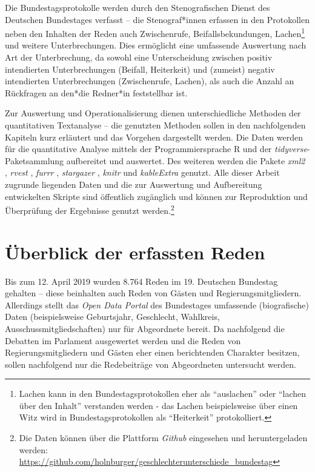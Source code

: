 \documentclass[12pt, 
    twoside=false, 
    bibliography=totoc, 
    numbers=endperiod, 
    headings=normal, 
    toc=chapterentrydotfill
    ]{scrbook}
\begin{document}
Die Bundestagsprotokolle werden durch den Stenografischen Dienst des Deutschen Bundestages verfasst -- die Stenograf*innen erfassen in den Protokollen neben den Inhalten der Reden auch Zwischenrufe, Beifallsbekundungen, Lachen\footnote{Lachen kann in den Bundestagsprotokollen eher als \enquote{auslachen} oder \enquote{lachen über den Inhalt} verstanden werden - das Lachen beispielsweise über einen Witz wird in Bundestagsprotokollen als \enquote{Heiterkeit} protokolliert.} und weitere Unterbrechungen. Dies ermöglicht eine umfassende Auswertung nach Art der Unterbrechung, da sowohl eine Unterscheidung zwischen positiv intendierten Unterbrechungen (Beifall, Heiterkeit) und (zumeist) negativ intendierten Unterbrechungen (Zwischenrufe, Lachen), als auch die Anzahl an Rückfragen an den*die Redner*in feststellbar ist.

Zur Auswertung und Operationalisierung dienen unterschiedliche Methoden der quantitativen Textanalyse -- die genutzten Methoden sollen in den nachfolgenden Kapiteln kurz erläutert und das Vorgehen dargestellt werden. Die Daten werden für die quantitative Analyse mittels der Programmiersprache R \parencite{rcoreteam_2018} und der \emph{tidyverse}-Paketsammlung \parencite{wickham_2017} aufbereitet und auswertet. Des weiteren werden die Pakete \emph{xml2} \parencite{wickham_2018}, \emph{rvest} \parencite{wickham_2016}, \emph{furrr} \parencite{vaughan_2018}, \emph{stargazer} \parencite{hlavac_2018}, \emph{knitr} \parencite{xie_2014} und \emph{kableExtra} \parencite{zhu_2019} genutzt. 
Alle dieser Arbeit zugrunde liegenden Daten und die zur Auswertung und Aufbereitung entwickelten Skripte sind öffentlich zugänglich und können zur Reproduktion und Überprüfung der Ergebnisse genutzt werden.\footnote{Die Daten können über die Plattform \emph{Github} eingesehen und heruntergeladen werden: \url{https://github.com/holnburger/geschlechterunterschiede_bundestag}}

\section{Überblick der erfassten Reden}\label{kapitel:ueberblick_reden}

Bis zum 12. April 2019 wurden 8.764 Reden im 19. Deutschen Bundestag gehalten -- diese beinhalten auch Reden von Gästen und Regierungsmitgliedern. Allerdings stellt das \emph{Open Data Portal} des Bundestages umfassende (biografische) Daten (beispielsweise Geburtsjahr, Geschlecht, Wahlkreis, Ausschussmitgliedschaften) nur für Abgeordnete bereit. Da nachfolgend die Debatten im Parlament ausgewertet werden und die Reden von Regierungsmitgliedern und Gästen eher einen berichtenden Charakter besitzen, sollen nachfolgend nur die Redebeiträge von Abgeordneten untersucht werden.
\end{document}
